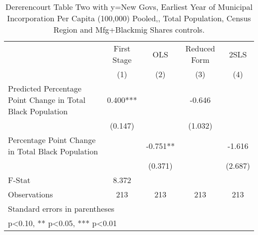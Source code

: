 \begin{table}[htbp]\centering
\def\sym#1{\ifmmode^{#1}\else\(^{#1}\)\fi}
\caption{Dererencourt Table Two with y=New Govs, Earliest Year of Municipal Incorporation Per Capita (100,000) Pooled,, Total Population, Census Region and Mfg+Blackmig Shares controls.}
\begin{tabular}{l*{4}{c}}
\toprule
                    & First Stage   &         OLS   &Reduced Form   &        2SLS   \\
                    &\multicolumn{1}{c}{(1)}   &\multicolumn{1}{c}{(2)}   &\multicolumn{1}{c}{(3)}   &\multicolumn{1}{c}{(4)}   \\
\midrule
Predicted Percentage Point Change in Total Black Population&       0.400***&               &      -0.646   &               \\
                    &     (0.147)   &               &     (1.032)   &               \\
\addlinespace
Percentage Point Change in Total Black Population&               &      -0.751** &               &      -1.616   \\
                    &               &     (0.371)   &               &     (2.687)   \\
\midrule
F-Stat              &       8.372   &               &               &               \\
Observations        &         213   &         213   &         213   &         213   \\
\bottomrule
\multicolumn{5}{l}{\footnotesize Standard errors in parentheses}\\
\multicolumn{5}{l}{\footnotesize * p<0.10, ** p<0.05, *** p<0.01}\\
\end{tabular}
\end{table}
